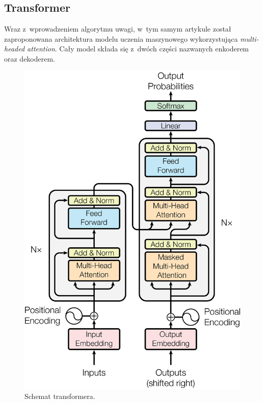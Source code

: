 \documentclass[data-science]{agh-wi} %
\begin{document}
\subsection{Transformer}
Wraz z~wprowadzeniem algorytmu uwagi, w~tym samym artykule został zaproponowana architektura modelu uczenia maszynowego wykorzystująca \textit{multi-headed attention}. Cały model składa się z~dwóch części nazwanych enkoderem oraz dekoderem.

\begin{figure}[!ht]
    \begin{center}
        \includegraphics[width=0.7\linewidth]{img/transformer1}
    \end{center}
    \caption{Schemat transformera.}
    \label{fig:transformer1}
\end{figure}
\end{document}
